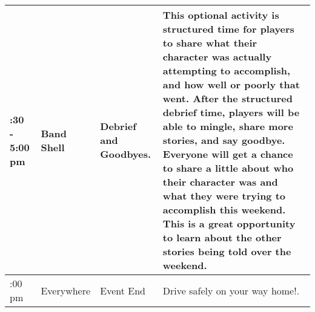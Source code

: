 \documentclass[green]{GL2020}
\begin{document}
\begin{tabularx}{\textwidth}{|>{\centering\arraybackslash} m{1.5cm} | >{\centering\arraybackslash} m{1.8cm} | >{\centering\arraybackslash} m{1.8cm} | >{\centering\arraybackslash}X |}
 \hline
  3:30 - 5:00 pm & Band Shell & Debrief and Goodbyes. & This \textbf{optional} activity is structured time for players to share what their character was actually attempting to accomplish, and how well or poorly that went. After the structured debrief time, players will be able to mingle, share more stories, and say goodbye.   Everyone will get a chance to share a little about who their character was and what they were trying to accomplish this weekend. This is a great opportunity to learn about the other stories being told over the weekend.\\
 \hline
  5:00 pm & Everywhere & Event End & Drive safely on your way home!.  \\
	\hline
\end{tabularx}
\end{document}
